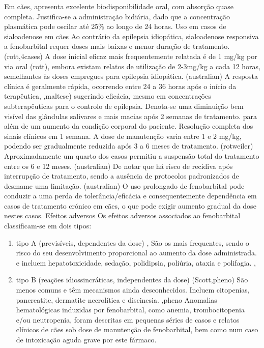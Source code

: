 Em cães, apresenta excelente biodisponibilidade oral, com absorção quase completa. \cite{Jukier2023} Justifica-se a administração bidiária, dado que a concentração plasmática pode oscilar até 25\% ao longo de 24 horas. \cite{Jukier2023}
Uso em casos de sialoadenose em cães
Ao contrário da epilepsia idiopática, sialoadenose responsiva a fenobarbital requer doses mais baixas e menor duração de tratamento. (rott,4cases) A dose inicial eficaz mais frequentemente relatada é de 1 mg/kg por via oral (rott), embora existam relatos de utilização de 2-3mg/kg a cada 12 horas, semelhantes às doses empregues para epilepsia idiopática.  (australian) 
A resposta clínica é geralmente rápida, ocorrendo entre 24 a 36 horas após o início da terapêutica, \cite{boydell_sialadenosis_2000},maltese) sugerindo eficácia, mesmo em concentrações subterapêuticas para o controlo de epilepsia. \cite{boydell_sialadenosis_2000} Denota-se uma diminuição bem visível das glândulas salivares e mais macias após 2 semanas de tratamento. para além de um aumento da condição corporal do paciente. Resolução completa dos sinais clínicos em 1 semana.
A dose de manutenção varia entre 1 e 2 mg/kg, podendo ser gradualmente reduzida após 3 a 6 meses de tratamento. (rotweiler) Aproximadamente um quarto dos casos permitiu a suspensão total do tratamento entre os 6 e 12 meses. (australian)
De notar que há risco de recidiva após interrupção de tratamento, sendo a ausência de protocolos padronizados de desmame uma limitação. (australian) O uso prolongado de fenobarbital pode conduzir a uma perda de tolerância/eficácia e consequentemente dependência em casos de tratamento crónico em cães, o que pode exigir aumento gradual da dose nestes casos. 
Efeitos adversos
Os efeitos adversos associados ao fenobarbital classificam-se em dois tipos: \cite{Bersan2014}\cite{Walton-Clark2022}

\begin{enumerate}
    \item	tipo A \cite{Bersan2014}\cite{Walton-Clark2022} (previsíveis, dependentes da dose) \cite{Scott2021},\cite{Bersan2014} São os mais frequentes, sendo o risco do seu desenvolvimento proporcional ao aumento da dose administrada. \cite{Scott2021} e incluem hepatotoxicidade, sedação, polidipsia, poliúria, ataxia e polifagia. \cite{Scott2021},\cite{Bersan2014}
    \item tipo B \cite{Bersan2014}\cite{Walton-Clark2022} (reações idiossincráticas, independentes da dose) (Scott,pheno) São menos comuns e têm mecanismos ainda desconhecidos.\cite{Scott2021} Incluem citopenias, pancreatite, dermatite necrolítica e discinesia. \cite{Scott2021},pheno Anomalias hematológicas induzidas por fenobarbital, como anemia, trombocitopenia e/ou neutropenia, foram descritas em pequenas séries de casos e relatos clínicos de cães sob dose de manutenção de fenobarbital, bem como num caso de intoxicação aguda grave por este fármaco.\cite{Bersan2014}

\end{enumerate}

